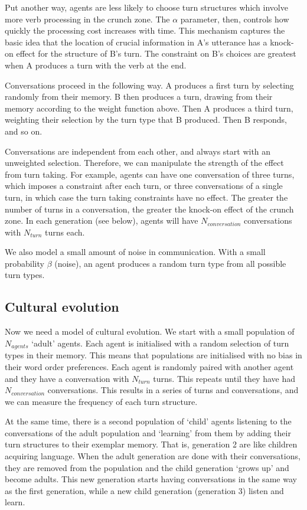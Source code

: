 \documentclass[12pt]{article}
\begin{document}
Put another way, agents are less likely to choose turn structures which involve more verb processing in the crunch zone.  The $\alpha$ parameter, then, controls how quickly the processing cost increases with time.  This mechanism captures the basic idea that the location of crucial information in A's utterance has a knock-on effect for the structure of B's turn.  The constraint on B's choices are greatest when A produces a turn with the verb at the end.

Conversations proceed in the following way.  A produces a first turn by selecting randomly from their memory.  B then produces a turn, drawing from their memory according to the weight function above.  Then A produces a third turn, weighting their selection by the turn type that B produced.  Then B responds, and so on.  

Conversations are independent from each other, and always start with an unweighted selection.  Therefore, we can manipulate the strength of the effect from turn taking.  For example, agents can have one conversation of three turns, which imposes a constraint after each turn, or three conversations of a single turn, in which case the turn taking constraints have no effect.  The greater the number of turns in a conversation, the greater the knock-on effect of the crunch zone.  In each generation (see below), agents will have $N_{conversation}$ conversations with $N_{turn}$ turns each.

We also model a small amount of noise in communication.  With a small probability $\beta$ (noise), an agent produces a random turn type from all possible turn types.

\subsection{Cultural evolution}

Now we need a model of cultural evolution.  We start with a small population of $N_{agents}$ `adult' agents.  Each agent is initialised with a random selection of turn types in their memory.  This means that populations are initialised with no bias in their word order preferences.  Each agent is randomly paired with another agent and they have a conversation with $N_{turn}$ turns.  This repeats until they have had $N_{conversation}$ conversations.  This results in a series of turns and conversations, and we can measure the frequency of each turn structure.

At the same time, there is a second population of `child' agents listening to the conversations of the adult population and `learning' from them by adding their turn structures to their exemplar memory.
That is, generation 2 are like children acquiring language.  When the adult generation are done with their conversations, they are removed from the population and the child generation `grows up' and become adults.  This new generation starts having conversations in the same way as the first generation, while a new child generation (generation 3) listen and learn.
\end{document}
